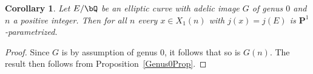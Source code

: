 \documentclass[11pt,reqno]{amsart}
\theoremstyle{plain}
\newtheorem{corollary}[theorem]{Corollary}
\theoremstyle{definition}
\newcommand{\Q}{\bQ}
\newcommand{\Z}{\bZ}
\newcommand{\PP}{\mathbf P}
\begin{document}
\begin{corollary}
Let $E/\Q$ be an elliptic curve with adelic image $G$ of genus $0$ and $n$ a positive integer. %
Then for all $n$ every $x \in X_1(n)$ with $j(x) = j(E)$ is $\PP^1$-parametrized.
\end{corollary}
\begin{proof}
Since $G$ is by assumption of genus $0$, it follows that so is $G(n)$. The result then follows from Proposition~\ref{Genus0Prop}.
\end{proof}

\begin{comment}
are of degree $d$.
Let $x'\in f^{-1}(x) \subseteq X_{B}$ be a point corresponding to $E$, and let $g\colon X_{B}\rightarrow X_1(n)$ be the map induced by the inclusion $B_1(N) \supseteq B$. The point $x'$ lies on a $\PP^1$ inside $X_B^{(d)}$ and hence $g(x')$ lies on a $\PP^1$ inside $X_1(n)^{(d)}$. Since no Abelian variety has $\PP^1$ as a subvariety, $\Phi_d$ contracts this $\PP^1$ inside $X_1(n)^{(d)}$ to a single point; it follows that $g(x')$ is not $\PP^1$-isolated.







We have the following commutative diagram:

$$
\xymatrix{
& X_B \ar[r]^{g} \ar[d]^{f} & X_1(N) \ar[d]^{q} \\
&X_{G(N)} \ar[r]^{h} & X_{G'},
}
$$
where $G'$ is defined to be the subgroup of $\GL_2(\Z/N\Z)$ generated by the union of $B_1(N)$ and $G(N)$, and the maps $q:X_1(N) \rightarrow X_{G'}$ and $h:X_G(N) \rightarrow X_{G'}$ are induced by the inclusion of the corresponding subgroups. The curve $X_{G'}$ is obviously of genus $0$ as it is covered by $X_{G(N)}$ of genus 0.

As $g(x')$ is of degree $d$ and $q(g(x'))=h(x)\in X_{G'}(\Q)$, it follows $\deg q\geq d$. Alternatively, the same conclusion follows from $\deg q=[\pm G':\pm B_1(N)]\geq [\pm G':\pm B]=d. $


\end{comment}
\end{document}
